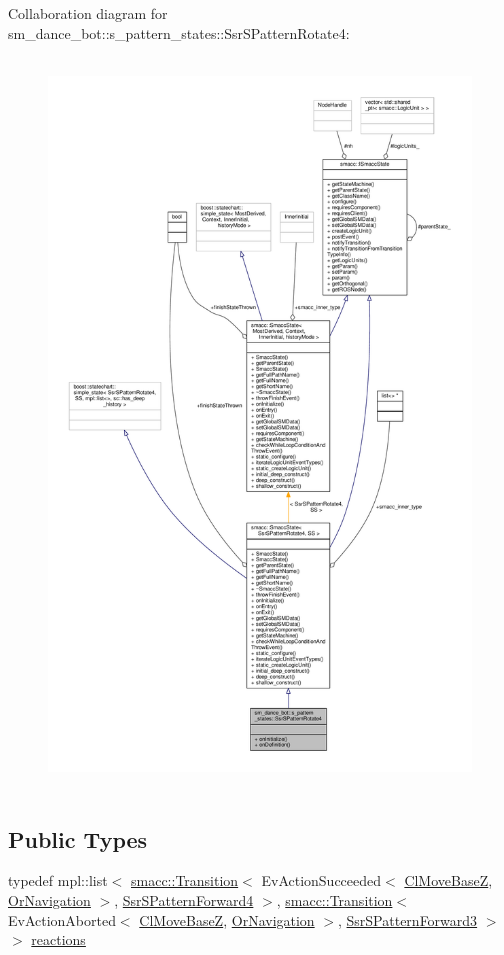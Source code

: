 Collaboration diagram for sm\+\_\+dance\+\_\+bot\+:\+:s\+\_\+pattern\+\_\+states\+:\+:Ssr\+S\+Pattern\+Rotate4\+:\nopagebreak
\begin{figure}[H]
\begin{center}
\leavevmode
\includegraphics[height=550pt]{structsm__dance__bot_1_1s__pattern__states_1_1SsrSPatternRotate4__coll__graph}
\end{center}
\end{figure}
\subsection*{Public Types}
\begin{DoxyCompactItemize}
\item 
typedef mpl\+::list$<$ \hyperlink{classsmacc_1_1Transition}{smacc\+::\+Transition}$<$ Ev\+Action\+Succeeded$<$ \hyperlink{classmove__base__z__client_1_1ClMoveBaseZ}{Cl\+Move\+BaseZ}, \hyperlink{classsm__dance__bot_1_1OrNavigation}{Or\+Navigation} $>$, \hyperlink{structsm__dance__bot_1_1s__pattern__states_1_1SsrSPatternForward4}{Ssr\+S\+Pattern\+Forward4} $>$, \hyperlink{classsmacc_1_1Transition}{smacc\+::\+Transition}$<$ Ev\+Action\+Aborted$<$ \hyperlink{classmove__base__z__client_1_1ClMoveBaseZ}{Cl\+Move\+BaseZ}, \hyperlink{classsm__dance__bot_1_1OrNavigation}{Or\+Navigation} $>$, \hyperlink{structsm__dance__bot_1_1s__pattern__states_1_1SsrSPatternForward3}{Ssr\+S\+Pattern\+Forward3} $>$ $>$ \hyperlink{structsm__dance__bot_1_1s__pattern__states_1_1SsrSPatternRotate4_a7e2786e660d6435b1d2c699b4d231b1b}{reactions}
\end{DoxyCompactItemize}

